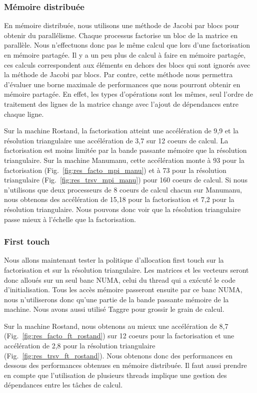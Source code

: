 \subsubsection{Mémoire distribuée}
En mémoire distribuée, nous utilisons une méthode de Jacobi par blocs pour obtenir du parallélisme.
%
Chaque processus factorise un bloc de la matrice en parallèle.
%
Nous n'effectuons donc pas le même calcul que lors d'une factorisation en mémoire partagée.
%
Il y a un peu plus de calcul à faire en mémoire partagée, ces calculs correspondent aux éléments en dehors des blocs qui sont ignorés avec la méthode de Jacobi par blocs.
%
Par contre, cette méthode nous permettra d'évaluer une borne maximale de performances que nous pourront obtenir en mémoire partagée.
%
En effet, les types d'opérations sont les mêmes, seul l'ordre de traitement des lignes de la matrice change avec l'ajout de dépendances entre chaque ligne.


Sur la machine Rostand, la factorisation atteint une accélération de 9,9 et la résolution triangulaire une accélération de 3,7 sur 12 coeurs de calcul.
%
La factorisation est moins limitée par la bande passante mémoire que la résolution triangulaire.
%
Sur la machine Manumanu, cette accélération monte à 93 pour la factorisation (Fig.~\ref{fig:res_facto_mpi_manu}) et à 73 pour la résolution triangulaire (Fig.~\ref{fig:res_trsv_mpi_manu}) pour 160 coeurs de calcul.
%
Si nous n'utilisons que deux processeurs de 8 coeurs de calcul chacun sur Manumanu, nous obtenons des accélération de 15,18 pour la factorisation et 7,2 pour la résolution triangulaire.
%
Nous pouvons donc voir que la résolution triangulaire passe mieux à l'échelle que la factorisation.


\subsubsection{First touch}
Nous allons maintenant tester la politique d'allocation first touch sur la factorisation et sur la résolution triangulaire.
%
Les matrices et les vecteurs seront donc alloués sur un seul banc NUMA, celui du thread qui a exécuté le code d'initialisation.
%
Tous les accès mémoire passeront ensuite par ce banc NUMA, nous n'utiliserons donc qu'une partie de la bande passante mémoire de la machine.
%
Nous avons aussi utilisé Taggre pour grossir le grain de calcul.


Sur la machine Rostand, nous obtenons au mieux une accélération de 8,7 (Fig.~\ref{fig:res_facto_ft_rostand}) sur 12 coeurs pour la factorisation et une accélération de 2,8 pour la résolution triangulaire (Fig.~\ref{fig:res_trsv_ft_rostand}).
%
Nous obtenons donc des performances en dessous des performances obtenues en mémoire distribuée.
%
Il faut aussi prendre en compte que l'utilisation de plusieurs threads implique une gestion des dépendances entre les tâches de calcul.


